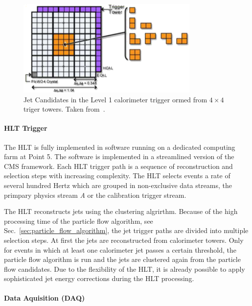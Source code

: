 \begin{figure}[htp]
    \centering
    \includegraphics[width=0.8\textwidth]{figures/cms_detector/l1_calo_towers.pdf}\hfill
    \caption[Jet Candidates in the Level 1 calorimeter trigger]{Jet Candidates
        in the Level 1 calorimeter trigger ormed from $4\times4$ triger towers. Taken from~\cite{Rose:2009zz}.}
    \label{fig:cms:l1_calo_towers}
\end{figure}


\paragraph{HLT Trigger} The HLT is fully implemented in software running on a
dedicated computing farm at Point 5. The software is implemented in a
streamlined version of the CMS framework. Each HLT trigger path is a sequence of
reconstruction and selection steps with increasing complexity. The HLT selects
events a rate of several hundred Hertz which are grouped in non-exclusive data
streams, \eg the primpary physics stream \emph{A} or the calibration trigger
stream.

The HLT reconstructs jets using the \antikt clustering algrirthm. Because of the
high processing time of the particle flow algorithm, see
Sec.~\ref{sec:particle_flow_algorithm}, the jet trigger paths are divided into
multiple selection steps. At first the jets are reconstructed from calorimeter
towers.  Only for events in which at least one calorimeter jet passes a certain
\pt threshold, the particle flow algorithm is run and the jets are clustered
again from the particle flow candidates. Due to the flexibility of the HLT, it
is already possible to apply sophisticated jet energy corrections during the HLT
processing.

\paragraph{Data Aquisition (DAQ)}

